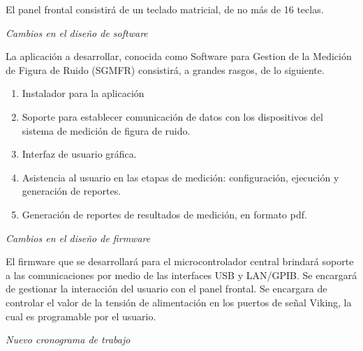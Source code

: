 \documentclass[paper=letter,oneside,fontsize=12pt, parskip=full]{article}
\begin{document}
	El panel frontal consistirá de un teclado matricial, de no más de 16 teclas. 
	
	\emph{Cambios en el diseño de software}
	
	La aplicación a desarrollar, conocida como Software para Gestion de la Medición de Figura de Ruido (SGMFR) consistirá, a grandes rasgos, de lo siguiente.
	
	\begin{enumerate}
		\item Instalador para la aplicación
		\item Soporte para establecer comunicación de datos con los dispositivos del sistema de medición de figura de ruido.
		\item Interfaz de usuario gráfica.
		\item Asistencia al usuario en las etapas de medición: configuración, ejecución y generación de reportes.
		\item Generación de reportes de resultados de medición, en formato pdf.
	\end{enumerate}

	\emph{Cambios en el diseño de firmware}
	
	El firmware que se desarrollará para el microcontrolador central brindará soporte a las comunicaciones por medio de las interfaces USB y LAN/GPIB. Se encargará de gestionar la interacción del usuario con el panel frontal. Se encargara de controlar el valor de la tensión de alimentación en los puertos de señal Viking, la cual es programable por el usuario.		
	
	
	\emph{Nuevo cronograma de trabajo}
\end{document}
